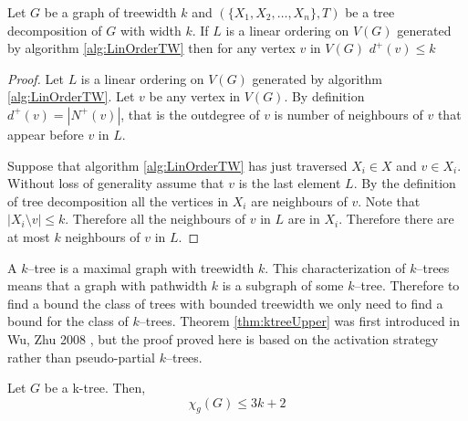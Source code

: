 \begin{lemma}[Askes] \label{Lemma_TWLinOrdBound}
    Let $G$ be a graph of treewidth $k$ and $(\{X_1,X_2,\dots,X_n\},T)$ be a tree decomposition of $G$ with width $k$.
    If $L$ is a linear ordering on $V(G)$ generated by algorithm \ref{alg:LinOrderTW} then for any vertex $v$ in $V(G)$ 
    $d^+(v) \leq k$
\end{lemma}

\begin{proof}    
    Let $L$ is a linear ordering on $V(G)$ generated by algorithm \ref{alg:LinOrderTW}. Let $v$ be any vertex in $V(G)$. By definition $d^+(v) = |N^+(v)|$, that is the outdegree of $v$ is number of neighbours of $v$ that appear before $v$ in $L$. 
    
    Suppose that algorithm \ref{alg:LinOrderTW} has just traversed $X_i\in X$ and $v\in X_i$. Without loss of generality assume that $v$ is the last element $L$. By the definition of tree decomposition all the vertices in $X_i$ are neighbours of $v$. Note that $|X_i\setminus v|\leq k$. Therefore all the neighbours of $v$ in $L$ are in $X_i$. Therefore there are at most $k$ neighbours of $v$ in $L$.   
\end{proof}


A $k$--tree is a maximal graph with treewidth $k$. This characterization of $k$--trees means that a graph with pathwidth $k$ is a subgraph of some $k$--tree. Therefore to find a bound the class of trees with bounded treewidth we only need to find a bound for the class of $k$--trees. Theorem \ref{thm:ktreeUpper} was first introduced in Wu, Zhu 2008 \cite{WuZhu2008}, but the proof proved here is based on the activation strategy rather than pseudo-partial $k$--trees.
\begin{theorem} \label{thm:ktreeUpper}
        Let $G$ be a k-tree. Then, 
        \[\chi_g(G) \leq 3k + 2\]
\end{theorem}

